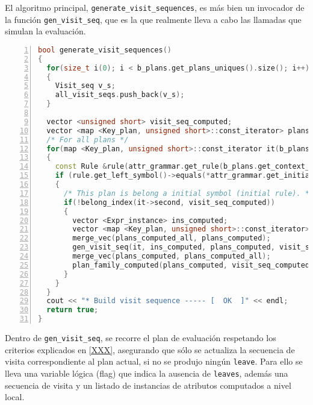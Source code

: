 El algoritmo principal, \texttt{generate\_visit\_sequences}, es más bien un invocador de la función \texttt{gen\_visit\_seq}, que es la que realmente lleva a cabo las llamadas que simulan la evaluación.

\begin{lstlisting}[language=C++, basicstyle=\tiny, numbers=left, columns=fullflexible, linewidth=14.5cm]
bool generate_visit_sequences()
{
  for(size_t i(0); i < b_plans.get_plans_uniques().size(); i++)
  {
    Visit_seq v_s;
    all_visit_seqs.push_back(v_s);
  }

  vector <unsigned short> visit_seq_computed;
  vector <map <Key_plan, unsigned short>::const_iterator> plans_computed_all;
  /* For all plans */
  for(map <Key_plan, unsigned short>::const_iterator it(b_plans.get_plans().begin()); it != b_plans.get_plans().end(); it++)
  {
    const Rule &rule(attr_grammar.get_rule(b_plans.get_context_unique(it->first.id_plan)[0]));
    if (rule.get_left_symbol()->equals(*attr_grammar.get_initial_symb()))
    {
      /* This plan is belong a initial symbol (initial rule). */
      if(!belong_index(it->second, visit_seq_computed))
      {
        vector <Expr_instance> ins_computed;
        vector <map <Key_plan, unsigned short>::const_iterator> plans_computed;
        merge_vec(plans_computed_all, plans_computed);
        gen_visit_seq(it, ins_computed, plans_computed, visit_seq_computed);
        merge_vec(plans_computed, plans_computed_all);
        plan_family_computed(plans_computed, visit_seq_computed);
      }
    }
  }
  cout << "* Build visit sequence ----- [  OK  ]" << endl;
  return true;
}
\end{lstlisting}

Dentro de \texttt{gen\_visit\_seq}, se recorre el plan de evaluación respetando los criterios explicados en \ref{XXX}, asegurando que sólo se actualiza la secuencia de visita correspondiente al plan actual, si no se produjo ningún \texttt{leave}. Para ello se lleva una variable lógica (flag) que indica la ausencia de \texttt{leaves}, además una secuencia de visita y un listado de instancias de atributos computados a nivel local.

